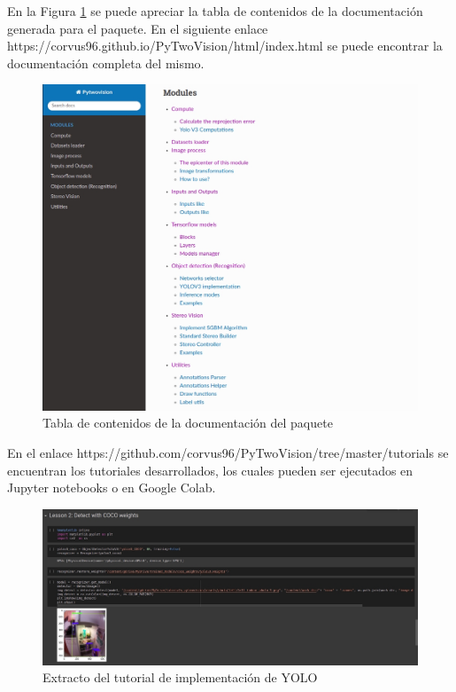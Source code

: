 En la Figura \ref{doc_contents} se puede apreciar la tabla de contenidos de la documentación generada para el paquete.
En el siguiente enlace https://corvus96.github.io/PyTwoVision/html/index.html se puede encontrar la documentación completa del mismo.
\begin{figure}[H]
    \centering
    \includegraphics[scale=0.5]{Recursos/doc_contents.jpg}
    \caption{Tabla de contenidos de la documentación del paquete}
    \label{doc_contents}
\end{figure}
En el enlace https://github.com/corvus96/PyTwoVision/tree/master/tutorials se encuentran los tutoriales desarrollados, los cuales pueden ser ejecutados en Jupyter notebooks o en Google Colab. 
\begin{figure}[H]
    \centering
    \includegraphics[scale=0.6]{Recursos/lesson_example.jpg}
    \caption{Extracto del tutorial de implementación de YOLO}
    \label{fig:my_label}
\end{figure}